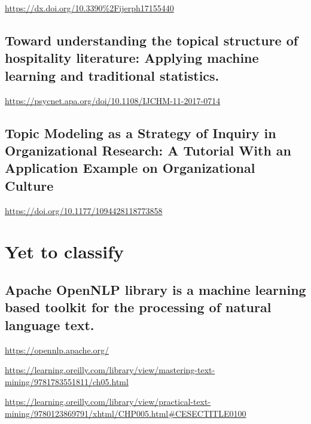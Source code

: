 \documentclass[
]{book}
\begin{document}
\url{https://dx.doi.org/10.3390\%2Fijerph17155440}

\hypertarget{toward-understanding-the-topical-structure-of-hospitality-literature-applying-machine-learning-and-traditional-statistics.}{%
\section{Toward understanding the topical structure of hospitality literature: Applying machine learning and traditional statistics.}\label{toward-understanding-the-topical-structure-of-hospitality-literature-applying-machine-learning-and-traditional-statistics.}}

\url{https://psycnet.apa.org/doi/10.1108/IJCHM-11-2017-0714}

\hypertarget{topic-modeling-as-a-strategy-of-inquiry-in-organizational-research-a-tutorial-with-an-application-example-on-organizational-culture}{%
\section{Topic Modeling as a Strategy of Inquiry in Organizational Research: A Tutorial With an Application Example on Organizational Culture}\label{topic-modeling-as-a-strategy-of-inquiry-in-organizational-research-a-tutorial-with-an-application-example-on-organizational-culture}}

\url{https://doi.org/10.1177/1094428118773858}

\hypertarget{yet-to-classify}{%
\chapter{Yet to classify}\label{yet-to-classify}}

\hypertarget{apache-opennlp-library-is-a-machine-learning-based-toolkit-for-the-processing-of-natural-language-text.-1}{%
\section{Apache OpenNLP library is a machine learning based toolkit for the processing of natural language text.}\label{apache-opennlp-library-is-a-machine-learning-based-toolkit-for-the-processing-of-natural-language-text.-1}}

\url{https://opennlp.apache.org/}

\url{https://learning.oreilly.com/library/view/mastering-text-mining/9781783551811/ch05.html}

\url{https://learning.oreilly.com/library/view/practical-text-mining/9780123869791/xhtml/CHP005.html\#CESECTITLE0100}
\end{document}
